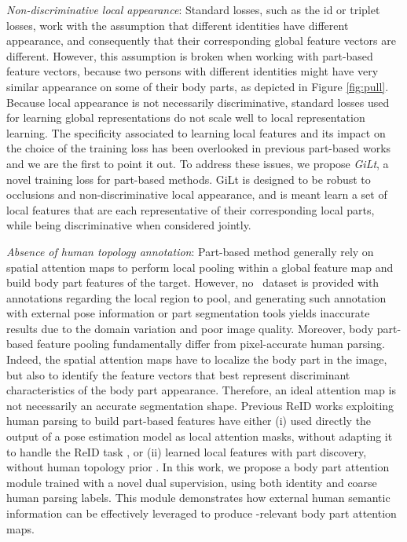 \documentclass[10pt,twocolumn,letterpaper]{article}
\begin{document}
 \textit{Non-discriminative local appearance}: 
Standard {\reid} losses, such as the id or triplet losses, work with the assumption that different identities have different appearance, and consequently that their corresponding global feature vectors are different.
However, this assumption is broken when working with part-based feature vectors, because two persons with different identities might have very similar appearance on some of their body parts, as depicted in Figure \ref{fig:pull}.
Because local appearance is not necessarily discriminative, standard {\reid} losses used for learning global representations do not scale well to local representation learning.
The specificity associated to learning local features and its impact on the choice of the training loss has been overlooked in previous part-based {\reid} works and we are the first to point it out.
To address these issues, we propose \textit{GiLt}, a novel training loss for part-based methods.
GiLt is designed to be robust to occlusions and non-discriminative local appearance, and is meant learn a set of local features that are each representative of their corresponding local parts, while being discriminative when considered jointly.
















 \textit{Absence of human topology annotation}:
Part-based method generally rely on spatial attention maps to perform local pooling within a global feature map and build body part features of the {\reid} target.
However, no \reid\ dataset is provided with annotations regarding the local region to pool, and generating such annotation with external pose information or part segmentation tools yields inaccurate results due to the domain variation and poor image quality.
Moreover, body part-based feature pooling fundamentally differ from pixel-accurate human parsing.
Indeed, the spatial attention maps have to localize the body part in the image, but also to identify the feature vectors that best represent discriminant characteristics of the body part appearance.
Therefore, an ideal attention map is not necessarily an accurate segmentation shape.
Previous ReID works exploiting human parsing to build part-based features have either (i) used directly the output of a pose estimation model as local attention masks, without adapting it to handle the ReID task \cite{PVPM, HOReID, PGFA}, or (ii) learned local features with part discovery, without human topology prior \cite{PAT, ISP, DLPAR}.
In this work, we propose a body part attention module trained with a novel dual supervision, using both identity and coarse human parsing labels.
This module demonstrates how external human semantic information can be effectively leveraged to produce {\reid}-relevant body part attention maps.
\end{document}
